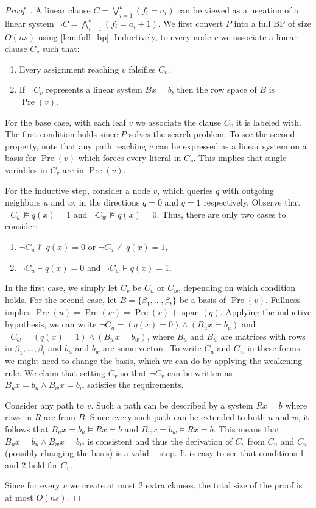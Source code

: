 \documentclass[10pt,a4paper]{article}
\theoremstyle{definition}
\theoremstyle{remark}
\DeclareMathOperator{\Span}{span}
\DeclareMathOperator{\pre}{Pre}
\DeclareMathOperator{\reslin}{\mathsf{Res}[\oplus]}
\begin{document}
\begin{proof}
  \medskip
  .
%
  A linear clause $C = \bigvee_{i=1}^k (f_i = a_i)$ can be viewed as a negation of a linear system $\neg C = \bigwedge_{i=1}^k (f_i = a_i + 1)$.
  We first convert $P$ into a full BP of size $O(ns)$ using \cref{lem:full_bp}. Inductively, to every node $v$ we associate a linear clause $C_v$ such that:
  \begin{enumerate}
    \item Every assignment reaching $v$ falsifies $C_v$.
    \item If $\neg C_v$ represents a linear system $Bx = b$, then the row space of $B$ is $\pre(v)$.
  \end{enumerate}
  For the base case, with each leaf $v$ we associate the clause $C_v$ it is labeled with. The first condition holds since $P$ solves the search problem. To see the second property, note that any path reaching $v$ can be expressed as a linear system on a basis for $\pre(v)$ which forces every literal in $C_v$. This implies that single variables in $C_v$ are in $\pre(v)$.

  For the inductive step, consider a node $v$, which queries $q$ with outgoing neighbors $u$ and $w$, in the directions $q=0$ and $q=1$ respectively. Observe that $\neg C_u \not \models q(x) = 1$ and $\neg C_w \not \models q(x) = 0$. Thus, there are only two cases to consider:
  \begin{enumerate}
    \item $\neg C_u \not \models q(x)=0$ or $\neg C_w \not \models q(x)=1$,
    \item $\neg C_u \models q(x)=0$ and $\neg C_w \models q(x)=1$.
  \end{enumerate}
  In the first case, we simply let $C_v$ be $C_u$ or $C_w$, depending on which condition holds. For the second case, let $B = \{\beta_1, \ldots, \beta_t\}$ be a basis of $\pre(v)$. Fullness implies $\pre(u) = \pre(w) = \pre(v) + \Span(q)$. Applying the inductive hypothesis, we can write $\neg C_u = (q(x)=0) \wedge (B_u x = b_u)$ and $\neg C_w = (q(x) = 1) \wedge (B_w x = b_w)$, where $B_u$ and $B_w$ are matrices with rows in $\beta_1, \ldots, \beta_t$ and $b_u$ and $b_w$ are some vectors. To write $C_u$ and $C_w$ in these forms, we might need to change the basis, which we can do by applying the weakening rule. We claim that setting $C_v$ so that $\neg C_v$ can be written as $B_u x= b_u \wedge B_w x = b_w$ satisfies the requirements.

  Consider any path to $v$. Such a path can be described by a system $Rx = b$ where rows in $R$ are from $B$. Since every such path can be extended to both $u$ and $w$, it follows that $B_u x = b_u \vDash Rx=b$ and $B_w x = b_w \vDash Rx = b$. This means that $B_u x = b_u \wedge B_w x = b_w$ is consistent and thus the derivation of $C_v$ from $C_u$ and $C_w$ (possibly changing the basis) is a valid $\reslin$ step. It is easy to see that conditions 1 and 2 hold for $C_v$.

  Since for every $v$ we create at most $2$ extra clauses, the total size of the proof is at most $O(ns)$.

 
\end{proof} 
\end{document}
